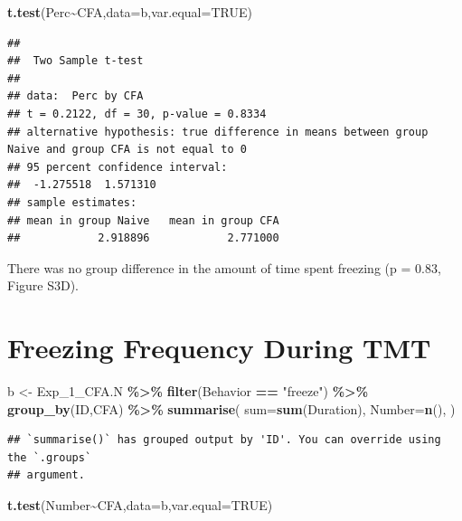 \documentclass[
]{book}
\newenvironment{Shaded}{\begin{snugshade}}{\end{snugshade}}
\newcommand{\AttributeTok}[1]{\textcolor[rgb]{0.13,0.29,0.53}{#1}}
\newcommand{\ConstantTok}[1]{\textcolor[rgb]{0.56,0.35,0.01}{#1}}
\newcommand{\FunctionTok}[1]{\textcolor[rgb]{0.13,0.29,0.53}{\textbf{#1}}}
\newcommand{\NormalTok}[1]{#1}
\newcommand{\OtherTok}[1]{\textcolor[rgb]{0.56,0.35,0.01}{#1}}
\newcommand{\SpecialCharTok}[1]{\textcolor[rgb]{0.81,0.36,0.00}{\textbf{#1}}}
\newcommand{\StringTok}[1]{\textcolor[rgb]{0.31,0.60,0.02}{#1}}
\begin{document}
\begin{Shaded}
\begin{Highlighting}[]
\FunctionTok{t.test}\NormalTok{(Perc}\SpecialCharTok{\textasciitilde{}}\NormalTok{CFA,}\AttributeTok{data=}\NormalTok{b,}\AttributeTok{var.equal=}\ConstantTok{TRUE}\NormalTok{)}
\end{Highlighting}
\end{Shaded}

\begin{verbatim}
## 
##  Two Sample t-test
## 
## data:  Perc by CFA
## t = 0.2122, df = 30, p-value = 0.8334
## alternative hypothesis: true difference in means between group Naive and group CFA is not equal to 0
## 95 percent confidence interval:
##  -1.275518  1.571310
## sample estimates:
## mean in group Naive   mean in group CFA 
##            2.918896            2.771000
\end{verbatim}

There was no group difference in the amount of time spent freezing (p = 0.83, Figure S3D).

\section*{Freezing Frequency During TMT}\label{freezing-frequency-during-tmt-1}

\begin{Shaded}
\begin{Highlighting}[]
\NormalTok{b }\OtherTok{\textless{}{-}}\NormalTok{ Exp\_1\_CFA.N  }\SpecialCharTok{\%\textgreater{}\%}
  \FunctionTok{filter}\NormalTok{(Behavior }\SpecialCharTok{==} \StringTok{"freeze"}\NormalTok{) }\SpecialCharTok{\%\textgreater{}\%}
  \FunctionTok{group\_by}\NormalTok{(ID,CFA) }\SpecialCharTok{\%\textgreater{}\%}
  \FunctionTok{summarise}\NormalTok{(}
    \AttributeTok{sum=}\FunctionTok{sum}\NormalTok{(Duration),}
    \AttributeTok{Number=}\FunctionTok{n}\NormalTok{(),}
\NormalTok{  )}
\end{Highlighting}
\end{Shaded}

\begin{verbatim}
## `summarise()` has grouped output by 'ID'. You can override using the `.groups`
## argument.
\end{verbatim}

\begin{Shaded}
\begin{Highlighting}[]
\FunctionTok{t.test}\NormalTok{(Number}\SpecialCharTok{\textasciitilde{}}\NormalTok{CFA,}\AttributeTok{data=}\NormalTok{b,}\AttributeTok{var.equal=}\ConstantTok{TRUE}\NormalTok{)}
\end{Highlighting}
\end{Shaded}
\end{document}
